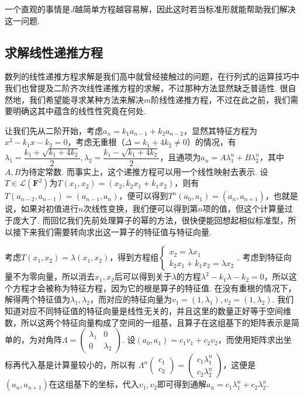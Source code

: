 一个直观的事情是$J$越简单方程越容易解，因此这时若当标准形就能帮助我们解决这一问题.

\subsection{求解线性递推方程}

数列的线性递推方程求解是我们高中就曾经接触过的问题，在行列式的运算技巧中我们也曾提及二阶齐次线性递推方程的求解，不过那种方法显然缺乏普适性. 很自然地，我们希望能寻求某种方法来解决$m$阶线性递推方程，不过在此之前，我们需要明确这其中蕴含的线性性究竟在何处.

让我们先从二阶开始，考虑$a_n = k_1 a_{n - 1} + k_2 a_{n - 2}$，显然其特征方程为$x^2 - k_1 x - k_2 = 0$，考虑无重根（$\Delta = k_1 + 4k_2 \neq 0$）的情况，有$\lambda_1 = \dfrac{k_1 + \sqrt{k_1 + 4k_2}}{2}, \lambda_2 = \dfrac{k_1 - \sqrt{k_1 + 4k_2}}{2}$，且通项为$a_n = A \lambda_1^n + B \lambda_2^n$，其中$A, B$为待定常数. 而事实上，这个递推方程可以用一个线性映射去表示. 设$T \in \mathcal{L}(\mathbf{F}^2)$为$T(x_1, x_2) = (x_2, k_2 x_1 + k_1 x_2)$，则有$T(a_{n - 2}, a_{n - 1}) = (a_{n - 1}, a_n)$，便可以得到$T^n(a_0, a_1) = (a_n, a_{n + 1})$，也就是说，如果对初值进行$n$次线性变换，我们便可以得到第$n$项的值，但这个计算量过于庞大了. 而回忆我们先前处理算子的幂的方法，很快便能回想起相似标准型，所以接下来我们需要转向求出这一算子的特征值与特征向量.

考虑$T(x_1, x_2) = \lambda (x_1, x_2)$，得到方程组$\begin{cases} x_2 = \lambda x_1 \\ k_2 x_1 + k_1 x_2 = \lambda x_2 \end{cases}.$ 考虑到特征向量不为零向量，所以消去$x_1, x_2$后可以得到关于$\lambda$的方程$\lambda^2 - k_1 \lambda - k_2 = 0$，所以这个方程才会被称为特征方程，因为它的根是算子的特征值. 在没有重根的情况下，解得两个特征值为$\lambda_1, \lambda_2$，而对应的特征向量为$v_1 = (1, \lambda_1), v_2 = (1, \lambda_2)$. 我们知道对应不同特征值的特征向量是线性无关的，并且这里的数量正好等于空间维数，所以这两个特征向量构成了空间的一组基，且算子在这组基下的矩阵表示是简单的，为对角阵$\Lambda = \begin{pmatrix} \lambda_1 & 0 \\ 0 & \lambda_2 \end{pmatrix}$. 设$(a_0, a_1) = c_1 v_1 + c_2 v_2$，而使用矩阵求出坐标再代入基是计算量较小的，所以有 $\Lambda^n \begin{pmatrix}
        c_1 \\ c_2
    \end{pmatrix} = \begin{pmatrix}
        c_1 \lambda_1^n \\ c_2 \lambda_2^n
    \end{pmatrix}$，这便是$(a_n, a_{n + 1})$在这组基下的坐标，代入$v_1, v_2$即可得到通解$a_n = c_1 \lambda_1^n + c_2 \lambda_2^n$.


